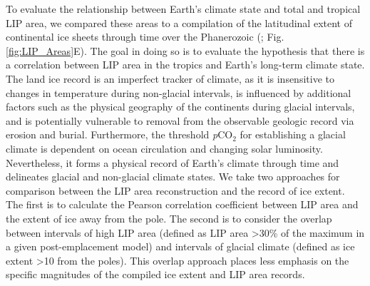 \documentclass[11pt,letterpaper]{article}
\begin{document}
To evaluate the relationship between Earth's climate state and total and tropical LIP area, we compared these areas to a compilation of the latitudinal extent of continental ice sheets through time over the Phanerozoic (\citealp{Macdonald2019a}; Fig. \ref{fig:LIP_Areas}E). The goal in doing so is to evaluate the hypothesis that there is a correlation between LIP area in the tropics and Earth's long-term climate state. The land ice record is an imperfect tracker of climate, as it is insensitive to changes in temperature during non-glacial intervals, is influenced by additional factors such as the physical geography of the continents during glacial intervals, and is potentially vulnerable to removal from the observable geologic record via erosion and burial. Furthermore, the threshold \textit{p}CO$_2$ for establishing a glacial climate is dependent on ocean circulation and changing solar luminosity. Nevertheless, it forms a physical record of Earth's climate through time and delineates glacial and non-glacial climate states. We take two approaches for comparison between the LIP area reconstruction and the record of ice extent. The first is to calculate the Pearson correlation coefficient between LIP area and the extent of ice away from the pole. The second is to consider the overlap between intervals of high LIP area (defined as LIP area \textgreater30\% of the maximum in a given post-emplacement model) and intervals of glacial climate (defined as ice extent \textgreater10\textdegree\xspace from the poles). This overlap approach places less emphasis on the specific magnitudes of the compiled ice extent and LIP area records.
\end{document}
